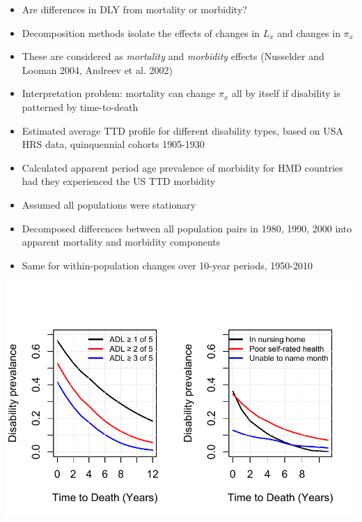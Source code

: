 \documentclass[20pt]{beamer}
\begin{document}
\begin{frame}[plain]
\begin{itemize}[<+>]
\item Are differences in DLY from mortality or
morbidity?
\item Decomposition methods isolate the effects of changes in $L_x$ and changes
in $\pi_x$
\item These are considered as \textit{mortality} and \textit{morbidity} effects (Nusselder and Looman 2004, Andreev et al. 2002) 
\item Interpretation problem: mortality can change $\pi_x$ all by itself if
disability is patterned by time-to-death
\end{itemize}
\end{frame}
\begin{frame}[plain]
\begin{itemize}[<+->]
\item Estimated average TTD profile for different disability types, based on USA HRS data, quinquennial cohorts 1905-1930
\item Calculated apparent period age prevalence of morbidity for HMD countries had they experienced the US TTD morbidity 
\item Assumed all populations were stationary
\item Decomposed differences between all population pairs in 1980, 1990, 2000 into apparent mortality and morbidity components
\item Same for within-population changes over 10-year periods, 1950-2010
\end{itemize}
\end{frame}
\begin{frame}[plain]
\begin{center}
\includegraphics[scale=1.3]{Figures/DisbyTTD_pres.pdf}
\end{center}
\end{frame}
\end{document}

